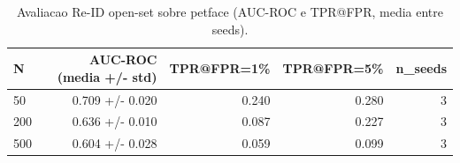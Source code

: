 \begin{table}[!htb]
\centering
\caption{Avaliacao Re-ID open-set sobre petface (AUC-ROC e TPR@FPR, media entre seeds).}
\label{tab:openset-resumo-petface}
\begin{tabular}{lrrrr}
\toprule
N & AUC-ROC (media +/- std) & TPR@FPR=1\% & TPR@FPR=5\% & n\_seeds \\
\midrule
50 & 0.709 +/- 0.020 & 0.240 & 0.280 & 3 \\
200 & 0.636 +/- 0.010 & 0.087 & 0.227 & 3 \\
500 & 0.604 +/- 0.028 & 0.059 & 0.099 & 3 \\
\bottomrule
\end{tabular}
\end{table}
